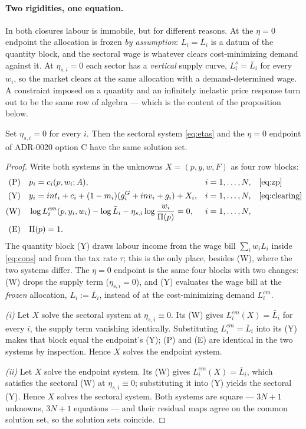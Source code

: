 \paragraph{Two rigidities, one equation.} In both closures labour is immobile,
but for different reasons. At the $\eta = 0$ endpoint the allocation is frozen
\emph{by assumption}: $L_i = \bar{L}_i$ is a datum of the quantity block, and
the sectoral wage is whatever clears cost-minimizing demand against it. At
$\eta_{s,i} = 0$ each sector has a \emph{vertical} supply curve,
$L^s_i = \bar{L}_i$ for every $w_i$, so the market clears at the same
allocation with a demand-determined wage. A constraint imposed on a quantity
and an infinitely inelastic price response turn out to be the same row of
algebra --- which is the content of the proposition below.

\begin{proposition}[The rigid corner is the $\eta = 0$ endpoint]\label{prop:nest}
Set $\eta_{s,i} = 0$ for every $i$. Then the sectoral system \eqref{eq:etas}
and the $\eta = 0$ endpoint of ADR-0020 option C have the same solution set.
\end{proposition}

\begin{proof}
Write both systems in the unknowns $X = (p, y, w, F)$ as four row blocks:
\begin{align*}
\text{(P)} \quad & p_i = c_i(p, w_i; A), & & i = 1,\dots,N,
   & & \text{\eqref{eq:zp}} \\
\text{(Y)} \quad & y_i = int_i + c_i + (1-m_i)(g^G_i + inv_i + g_i) + X_i,
   & & i = 1,\dots,N, & & \text{\eqref{eq:clearing}} \\
\text{(W)} \quad & \log L^{cm}_i(p,y_i,w_i) - \log \bar{L}_i
   - \eta_{s,i} \log \frac{w_i}{\Pi(p)} = 0, & & i = 1,\dots,N, & & \\
\text{(E)} \quad & \Pi(p) = 1. & & & &
\end{align*}
The quantity block (Y) draws labour income from the wage bill
$\sum_i w_i L_i$ inside \eqref{eq:cons} and from the tax rate $\tau$; this is
the only place, besides (W), where the two systems differ. The $\eta = 0$
endpoint is the same four blocks with two changes: (W) drops the supply term
($\eta_{s,i} = 0$), and (Y) evaluates the wage bill at the \emph{frozen}
allocation, $L_i := \bar{L}_i$, instead of at the cost-minimizing demand
$L^{cm}_i$.

\emph{(i)} Let $X$ solve the sectoral system at $\eta_{s,i} \equiv 0$. Its (W)
gives $L^{cm}_i(X) = \bar{L}_i$ for every $i$, the supply term vanishing
identically. Substituting $L^{cm}_i = \bar{L}_i$ into its (Y) makes that block
equal the endpoint's (Y); (P) and (E) are identical in the two systems by
inspection. Hence $X$ solves the endpoint system.

\emph{(ii)} Let $X$ solve the endpoint system. Its (W) gives
$L^{cm}_i(X) = \bar{L}_i$, which satisfies the sectoral (W) at
$\eta_{s,i} \equiv 0$; substituting it into (Y) yields the sectoral (Y). Hence
$X$ solves the sectoral system. Both systems are square --- $3N+1$ unknowns,
$3N+1$ equations --- and their residual maps agree on the common solution set,
so the solution sets coincide.
\end{proof}

